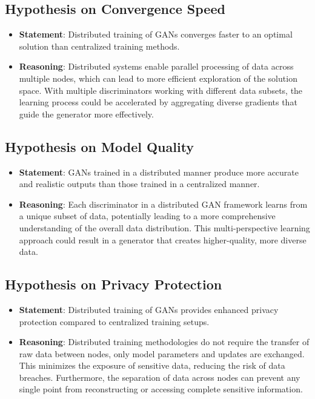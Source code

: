 \subsection{Hypothesis on Convergence Speed}
\begin{itemize}
    \item \textbf{Statement}: Distributed training of GANs converges faster to an optimal solution than centralized training methods.
    \item \textbf{Reasoning}: Distributed systems enable parallel processing of data across multiple nodes, which can lead to more efficient exploration of the solution space. With multiple discriminators working with different data subsets, the learning process could be accelerated by aggregating diverse gradients that guide the generator more effectively.
\end{itemize}


\subsection{Hypothesis on Model Quality}
\begin{itemize}
    \item \textbf{Statement}: GANs trained in a distributed manner produce more accurate and realistic outputs than those trained in a centralized manner.
    \item \textbf{Reasoning}: Each discriminator in a distributed GAN framework learns from a unique subset of data, potentially leading to a more comprehensive understanding of the overall data distribution. This multi-perspective learning approach could result in a generator that creates higher-quality, more diverse data.
\end{itemize}

\subsection{Hypothesis on Privacy Protection}
\begin{itemize}
    \item \textbf{Statement}: Distributed training of GANs provides enhanced privacy protection compared to centralized training setups.
    \item \textbf{Reasoning}: Distributed training methodologies do not require the transfer of raw data between nodes, only model parameters and updates are exchanged. This minimizes the exposure of sensitive data, reducing the risk of data breaches. Furthermore, the separation of data across nodes can prevent any single point from reconstructing or accessing complete sensitive information.
\end{itemize}



